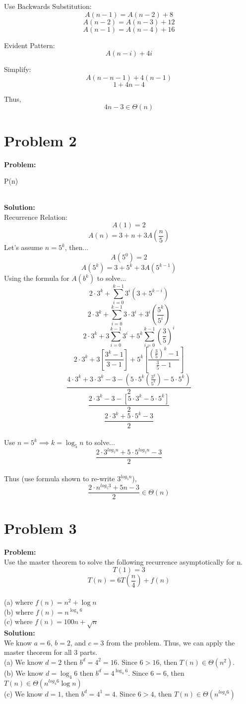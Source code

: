\documentclass{article}
\begin{document}
Use Backwards Substitution: \\
\[A(n-1) = A(n-2) + 8\]
\[A(n-2) = A(n-3) + 12\]
\[A(n-1) = A(n-4) + 16\] 

Evident Pattern: \\
\[A(n-i) +4i\]

Simplify:
\[A(n-n-1) + 4(n-1)\]
\[1+4n-4\]

Thus,
\[4n-3 \in \Theta(n)\]

\section{Problem 2}
\textbf{Problem:} \\
\begin{algorithm}
\caption{P(n)}
\end{algorithm} \\
\textbf{Solution: } \\
Recurrence Relation:
\[A(1) = 2\]
\[A(n) = 3 + n + 3A(\frac{n}{5})\]
Let's assume $n = 5^k$, then...
\[A(5^0) = 2\]
\[A(5^k) = 3 + 5^k + 3A(5^{k-1})\]
Using the formula for $A(b^k)$ to solve...
\[ 2 \cdot 3^k + \sum_{i=0}^{k-1} 3^i(3+5^{k-i})\]
\[2 \cdot 3^k + \sum_{i=0}^{k-1} 3\cdot3^{i} + 3^i(\frac{5^k}{5^i})\]
\[2 \cdot 3^k + 3\sum_{i=0}^{k-1} 3^i + 5^k\sum_{i=0}^{k-1} (\frac{3}{5})^i\]
\[2 \cdot 3^k + 3[\frac{3^k - 1}{3-1}] + 5^k[\frac{(\frac{3}{5})^k - 1}{\frac{3}{5} - 1}]\]
\[\frac{4\cdot3^k + 3\cdot3^k - 3 - (5\cdot5^k(\frac{3^k}{5^k})-5\cdot5^k)}{2}\]
\[\frac{2\cdot3^k - 3 - [5\cdot3^k - 5\cdot5^k]}{2}\]
\[\frac{2\cdot3^k + 5\cdot5^k - 3}{2}\] \\
Use $n = 5^k \implies k=\log_5 n$ to solve...
\[\frac{ 2\cdot3^{log_5 n}+ 5\cdot5^{log_5 n} - 3}{2}\] \\
Thus (use formula shown to re-write $3^{log_5 n}$),
\[\frac{ 2\cdot n^{log_5 3}+ 5n - 3}{2} \in \Theta(n)\]


\section{Problem 3}
\textbf{Problem:} \\
Use the master theorem to solve the following recurrence asymptotically for
n.
\[T(1) = 3\]
\[T(n) = 6T(\frac{n}{4}) + f(n)\] \\
(a) where $f(n) = n^2 + \log n$ \\
(b) where $f(n) = n^{\log_4 6}$ \\
(c) where $f(n) = 100n + \sqrt{n}$ \\
\textbf{Solution:} \\
We know $a =6$, $b=2$, and $c=3$ from the problem. Thus, we can apply the master theorem for all 3 parts.\\
(a) We know $d=2$ then $b^d = 4^2 = 16$. Since $ 6 > 16$, then $T(n) \in \Theta(n^2)$. \\
(b) We know $d=\log_4 6$ then $b^d = 4^{\log_4 6}$. Since $6=6$, then $T(n) \in \Theta(n^{log_4 6} \log n)$ \\
(c) We know $d=1$, then $b^d = 4^1 = 4$. Since $6 > 4$, then $T(n) \in \Theta(n^{log_4 6})$
\end{document}
